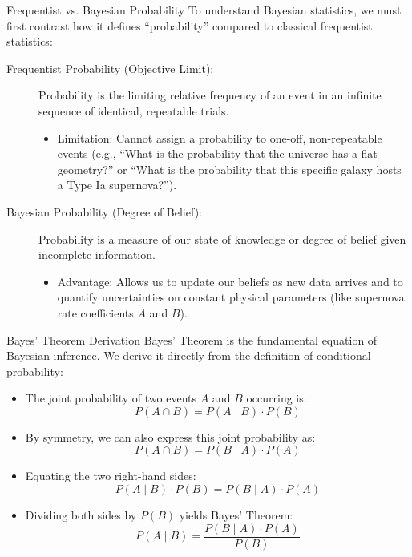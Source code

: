 \documentclass[9pt]{beamer}
\begin{document}
\begin{frame}{Frequentist vs. Bayesian Probability}
  To understand Bayesian statistics, we must first contrast how it defines ``probability'' compared to classical frequentist statistics:
  \begin{description}
    \item[Frequentist Probability (Objective Limit):]
      Probability is the limiting relative frequency of an event in an infinite sequence of identical, repeatable trials.
      \begin{itemize}
        \item \alert{Limitation:} Cannot assign a probability to one-off, non-repeatable events (e.g., ``What is the probability that the universe has a flat geometry?'' or ``What is the probability that this specific galaxy hosts a Type Ia supernova?'').
      \end{itemize}
    \item[Bayesian Probability (Degree of Belief):]
      Probability is a measure of our state of knowledge or degree of belief given incomplete information.
      \begin{itemize}
        \item \alert{Advantage:} Allows us to update our beliefs as new data arrives and to quantify uncertainties on constant physical parameters (like supernova rate coefficients $A$ and $B$).
      \end{itemize}
  \end{description}
\end{frame}

\begin{frame}{Bayes' Theorem Derivation}
  Bayes' Theorem is the fundamental equation of Bayesian inference. We derive it directly from the definition of conditional probability:
  \begin{itemize}
    \item The joint probability of two events $A$ and $B$ occurring is:
      $$P(A \cap B) = P(A \mid B) \cdot P(B)$$
    \item By symmetry, we can also express this joint probability as:
      $$P(A \cap B) = P(B \mid A) \cdot P(A)$$
    \item Equating the two right-hand sides:
      $$P(A \mid B) \cdot P(B) = P(B \mid A) \cdot P(A)$$
    \item Dividing both sides by $P(B)$ yields Bayes' Theorem:
      $$P(A \mid B) = \frac{P(B \mid A) \cdot P(A)}{P(B)}$$
  \end{itemize}
\end{frame}
\end{document}
